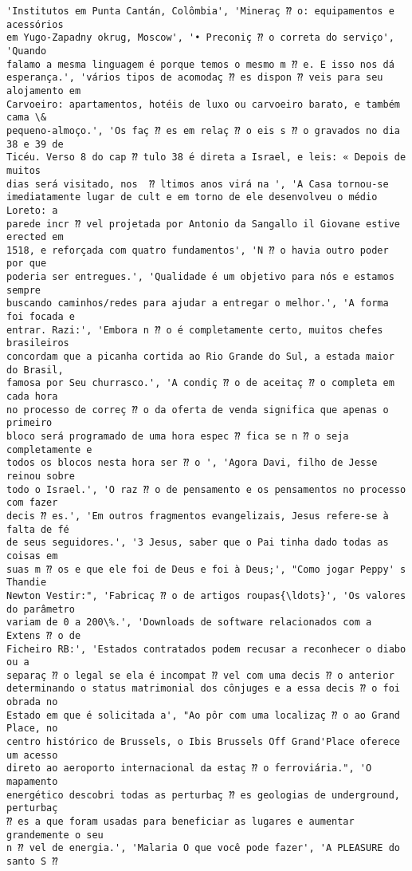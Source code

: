 \documentclass[10pt]{article}
\begin{document}
\begin{Verbatim}[commandchars=\\\{\}]
'Institutos em Punta Cantán, Colômbia', 'Mineraç ⁇ o: equipamentos e acessórios
em Yugo-Zapadny okrug, Moscow', '• Preconiç ⁇ o correta do serviço', 'Quando
falamo a mesma linguagem é porque temos o mesmo m ⁇ e. E isso nos dá
esperança.', 'vários tipos de acomodaç ⁇ es dispon ⁇ veis para seu alojamento em
Carvoeiro: apartamentos, hotéis de luxo ou carvoeiro barato, e também cama \&
pequeno-almoço.', 'Os faç ⁇ es em relaç ⁇ o eis s ⁇ o gravados no dia 38 e 39 de
Ticéu. Verso 8 do cap ⁇ tulo 38 é direta a Israel, e leis: « Depois de muitos
dias será visitado, nos  ⁇ ltimos anos virá na ', 'A Casa tornou-se
imediatamente lugar de cult e em torno de ele desenvolveu o médio Loreto: a
parede incr ⁇ vel projetada por Antonio da Sangallo il Giovane estive erected em
1518, e reforçada com quatro fundamentos', 'N ⁇ o havia outro poder por que
poderia ser entregues.', 'Qualidade é um objetivo para nós e estamos sempre
buscando caminhos/redes para ajudar a entregar o melhor.', 'A forma foi focada e
entrar. Razi:', 'Embora n ⁇ o é completamente certo, muitos chefes brasileiros
concordam que a picanha cortida ao Rio Grande do Sul, a estada maior do Brasil,
famosa por Seu churrasco.', 'A condiç ⁇ o de aceitaç ⁇ o completa em cada hora
no processo de correç ⁇ o da oferta de venda significa que apenas o primeiro
bloco será programado de uma hora espec ⁇ fica se n ⁇ o seja completamente e
todos os blocos nesta hora ser ⁇ o ', 'Agora Davi, filho de Jesse reinou sobre
todo o Israel.', 'O raz ⁇ o de pensamento e os pensamentos no processo com fazer
decis ⁇ es.', 'Em outros fragmentos evangelizais, Jesus refere-se à falta de fé
de seus seguidores.', '3 Jesus, saber que o Pai tinha dado todas as coisas em
suas m ⁇ os e que ele foi de Deus e foi à Deus;', "Como jogar Peppy' s Thandie
Newton Vestir:", 'Fabricaç ⁇ o de artigos roupas{\ldots}', 'Os valores do parâmetro
variam de 0 a 200\%.', 'Downloads de software relacionados com a Extens ⁇ o de
Ficheiro RB:', 'Estados contratados podem recusar a reconhecer o diabo ou a
separaç ⁇ o legal se ela é incompat ⁇ vel com uma decis ⁇ o anterior
determinando o status matrimonial dos cônjuges e a essa decis ⁇ o foi obrada no
Estado em que é solicitada a', "Ao pôr com uma localizaç ⁇ o ao Grand Place, no
centro histórico de Brussels, o Ibis Brussels Off Grand'Place oferece um acesso
direto ao aeroporto internacional da estaç ⁇ o ferroviária.", 'O mapamento
energético descobri todas as perturbaç ⁇ es geologias de underground, perturbaç
⁇ es a que foram usadas para beneficiar as lugares e aumentar grandemente o seu
n ⁇ vel de energia.', 'Malaria O que você pode fazer', 'A PLEASURE do santo S ⁇

\end{Verbatim}
\end{document}
